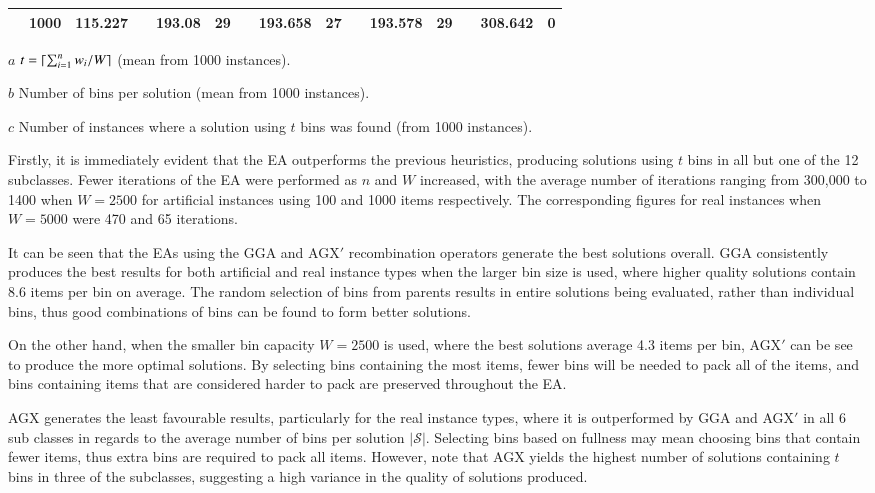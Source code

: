 \documentclass[authoryear]{elsarticle}
\begin{document}
\begin{table}[h!]
\begin{threeparttable}
\begin{tabular}{crr c rr c rr c rr c rr}
	& 1000 & 115.227 && \textbf{193.08} & \textbf{29} && 193.658 & 27 && 193.578 &\textbf{29} && 308.642 & 0\\
	\bottomrule
\end{tabular}	
\vspace{0.2cm} %
\begin{tablenotes}
	\item[$a$] $t = \lceil\sum_{i=1}^{n} w_i / W\rceil$ (mean from 1000 instances).
	\item[$b$] Number of bins per solution (mean from 1000 instances).
	\item[$c$] Number of instances where a solution using $t$ bins was found (from 1000 instances).
\end{tablenotes}
\end{threeparttable}
\label{table:ea}
\end{table}


Firstly, it is immediately evident that the EA outperforms the previous heuristics, producing solutions using $t$ bins in all but one of the 12 subclasses. Fewer iterations of the EA were performed as $n$ and $W$ increased, with the average number of iterations ranging from 300,000 to 1400 when $W=2500$ for artificial instances using 100 and 1000 items respectively. The corresponding figures for real instances when $W=5000$ were 470 and 65 iterations.

It can be seen that the EAs using the GGA and AGX$'$ recombination operators generate the best solutions overall. GGA consistently produces the best results for both artificial and real instance types when the larger bin size is used, where higher quality solutions contain 8.6 items per bin on average. The random selection of bins from parents results in entire solutions being evaluated, rather than individual bins, thus good combinations of bins can be found to form better solutions.

\noindent On the other hand, when the smaller bin capacity $W=2500$ is used, where the best solutions average 4.3 items per bin, AGX$'$ can be see to produce the more optimal solutions. By selecting bins containing the most items, fewer bins will be needed to pack all of the items, and bins containing items that are considered harder to pack are preserved throughout the EA. 

AGX generates the least favourable results, particularly for the real instance types, where it is outperformed by GGA and AGX$'$ in all 6 sub classes in regards to the average number of bins per solution $|\mathcal{S}|$. Selecting bins based on fullness may mean choosing bins that contain fewer items, thus extra bins are required to pack all items. However, note that AGX yields the highest number of solutions containing $t$ bins in three of the subclasses, suggesting a high variance in the quality of solutions produced.
\end{document}
